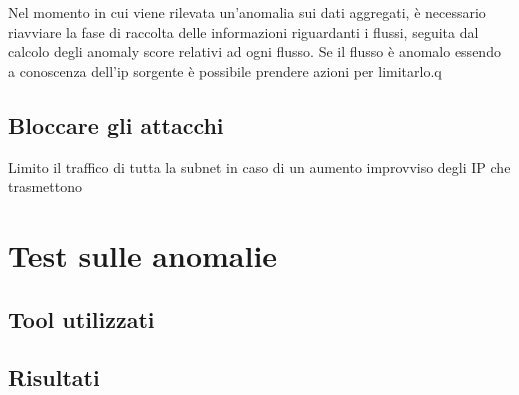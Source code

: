 Nel momento in cui viene rilevata un'anomalia sui dati aggregati, è necessario riavviare la fase di raccolta delle informazioni riguardanti i flussi, seguita dal calcolo degli anomaly score relativi ad ogni flusso. Se il flusso è anomalo essendo a conoscenza dell'ip sorgente è possibile prendere azioni per limitarlo.q


\subsection{Bloccare gli attacchi}


Limito il traffico di tutta la subnet in caso di un aumento improvviso degli IP che trasmettono

\section{Test sulle anomalie}
\subsection{Tool utilizzati}
\subsection{Risultati}
